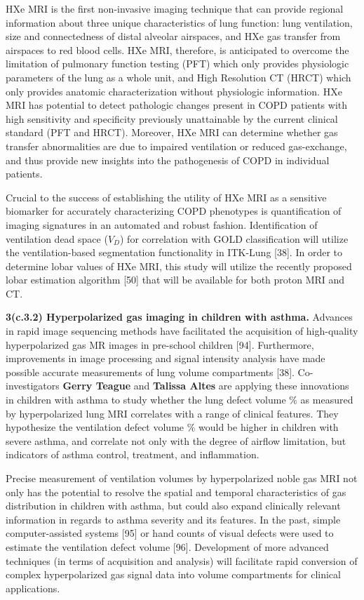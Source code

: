 \documentclass[11pt,]{article}
\begin{document}
HXe MRI is the first non-invasive imaging technique that can provide
regional information about three unique characteristics of lung
function: lung ventilation, size and connectedness of distal alveolar
airspaces, and HXe gas transfer from airspaces to red blood cells. HXe
MRI, therefore, is anticipated to overcome the limitation of pulmonary
function testing (PFT) which only provides physiologic parameters of the
lung as a whole unit, and High Resolution CT (HRCT) which only provides
anatomic characterization without physiologic information. HXe MRI has
potential to detect pathologic changes present in COPD patients with
high sensitivity and specificity previously unattainable by the current
clinical standard (PFT and HRCT). Moreover, HXe MRI can determine
whether gas transfer abnormalities are due to impaired ventilation or
reduced gas-exchange, and thus provide new insights into the
pathogenesis of COPD in individual patients.

Crucial to the success of establishing the utility of HXe MRI as a
sensitive biomarker for accurately characterizing COPD phenotypes is
quantification of imaging signatures in an automated and robust fashion.
Identification of ventilation dead space (\(V_D\)) for correlation with
GOLD classification will utilize the ventilation-based segmentation
functionality in ITK-Lung {[}38{]}. In order to determine lobar values
of HXe MRI, this study will utilize the recently proposed lobar
estimation algorithm {[}50{]} that will be available for both proton MRI
and CT.

\textbf{3(c.3.2) Hyperpolarized gas imaging in children with asthma.}
Advances in rapid image sequencing methods have facilitated the
acquisition of high-quality hyperpolarized gas MR images in pre-school
children {[}94{]}. Furthermore, improvements in image processing and
signal intensity analysis have made possible accurate measurements of
lung volume compartments {[}38{]}. Co-investigators \textbf{Gerry
Teague} and \textbf{Talissa Altes} are applying these innovations in
children with asthma to study whether the lung defect volume \% as
measured by hyperpolarized lung MRI correlates with a range of clinical
features. They hypothesize the ventilation defect volume \% would be
higher in children with severe asthma, and correlate not only with the
degree of airflow limitation, but indicators of asthma control,
treatment, and inflammation.

Precise measurement of ventilation volumes by hyperpolarized noble gas
MRI not only has the potential to resolve the spatial and temporal
characteristics of gas distribution in children with asthma, but could
also expand clinically relevant information in regards to asthma
severity and its features. In the past, simple computer-assisted systems
{[}95{]} or hand counts of visual defects were used to estimate the
ventilation defect volume {[}96{]}. Development of more advanced
techniques (in terms of acquisition and analysis) will facilitate rapid
conversion of complex hyperpolarized gas signal data into volume
compartments for clinical applications.
\end{document}
